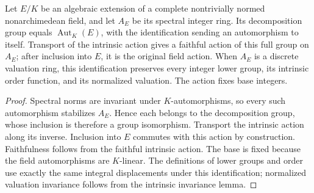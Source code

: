 \begin{lemma}
\label{fw:spectral-full-galois-action}
\leanok
Let $E/K$ be an algebraic extension of a complete nontrivially normed
nonarchimedean field, and let $A_E$ be its spectral integer ring.
Its decomposition group equals $\operatorname{Aut}_K(E)$, with the
identification sending an automorphism to itself. Transport of the
intrinsic action gives a faithful action of this full group on $A_E$;
after inclusion into $E$, it is the original field action.
When $A_E$ is a discrete valuation ring, this identification preserves
every integer lower group, its intrinsic order function, and its
normalized valuation. The action fixes base integers.
\end{lemma}
\begin{proof}
Spectral norms are invariant under $K$-automorphisms, so every such
automorphism stabilizes $A_E$. Hence each belongs to the decomposition
group, whose inclusion is therefore a group isomorphism. Transport the
intrinsic action along its inverse. Inclusion into $E$ commutes with
this action by construction. Faithfulness follows from the faithful
intrinsic action. The base is fixed because the field automorphisms
are $K$-linear. The definitions of lower groups and order use exactly
the same integral displacements under this identification; normalized
valuation invariance follows from the intrinsic invariance lemma.
\end{proof}


